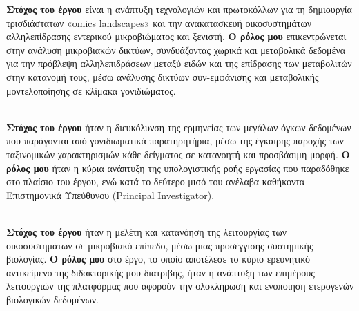 \documentclass[
    a4paper,
]{../fortysecondscv}
\begin{document}
\makefrontsidebar



    \begin{cvtable}[1]

        {
         \textbf{Στόχος του έργου} είναι η ανάπτυξη τεχνολογιών και πρωτοκόλλων για τη δημιουργία τρισδιάστατων «omics landscapes» και την ανακατασκευή οικοσυστημάτων αλληλεπίδρασης εντερικού μικροβιώματος και ξενιστή. 
         \textbf{Ο ρόλος μου} επικεντρώνεται στην ανάλυση μικροβιακών δικτύων, συνδυάζοντας χωρικά και μεταβολικά δεδομένα για την πρόβλεψη αλληλεπιδράσεων μεταξύ ειδών και της επίδρασης των μεταβολιτών στην κατανομή τους, μέσω ανάλυσης δικτύων συν-εμφάνισης και μεταβολικής μοντελοποίησης σε κλίμακα γονιδιώματος. 
        } 
      
      \\

      {
            \textbf{Στόχος του έργου} ήταν η διευκόλυνση της ερμηνείας των μεγάλων όγκων δεδομένων που παράγονται από γονιδιωματικά παρατηρητήρια, μέσω της έγκαιρης παροχής των ταξινομικών χαρακτηρισμών κάθε δείγματος σε κατανοητή και προσβάσιμη μορφή. 
            \textbf{Ο ρόλος μου} ήταν η κύρια ανάπτυξη της υπολογιστικής ροής εργασίας που παραδόθηκε στο πλαίσιο του έργου, ενώ κατά το δεύτερο μισό του ανέλαβα καθήκοντα Επιστημονικά Υπεύθυνου (Principal Investigator).
        } 
      
      \\

            {
            \textbf{Στόχος του έργου} ήταν η μελέτη και κατανόηση της λειτουργίας των οικοσυστημάτων σε μικροβιακό επίπεδο, μέσω μιας προσέγγισης συστημικής βιολογίας. 
            \textbf{Ο ρόλος μου} στο έργο, το οποίο αποτέλεσε το κύριο ερευνητικό αντικείμενο της διδακτορικής μου διατριβής, ήταν η ανάπτυξη των επιμέρους λειτουργιών της πλατφόρμας που αφορούν την ολοκλήρωση και ενοποίηση ετερογενών βιολογικών δεδομένων.
        } 
      
      \\
        

\end{cvtable}
\end{document}
